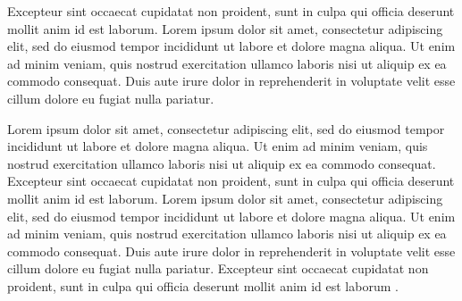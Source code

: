 \documentclass[english]{sbc2025}%
\begin{document}
Excepteur sint occaecat cupidatat non proident, sunt in culpa qui officia deserunt mollit anim id est laborum. Lorem ipsum dolor sit amet, consectetur adipiscing elit, sed do eiusmod tempor incididunt ut labore et dolore magna aliqua. Ut enim ad minim veniam, quis nostrud exercitation ullamco laboris nisi ut aliquip ex ea commodo consequat. Duis aute irure dolor in reprehenderit in voluptate velit esse cillum dolore eu fugiat nulla pariatur. 

Lorem ipsum dolor sit amet, consectetur adipiscing elit, sed do eiusmod tempor incididunt ut labore et dolore magna aliqua. Ut enim ad minim veniam, quis nostrud exercitation ullamco laboris nisi ut aliquip ex ea commodo consequat. Excepteur sint occaecat cupidatat non proident, sunt in culpa qui officia deserunt mollit anim id est laborum. Lorem ipsum dolor sit amet, consectetur adipiscing elit, sed do eiusmod tempor incididunt ut labore et dolore magna aliqua. Ut enim ad minim veniam, quis nostrud exercitation ullamco laboris nisi ut aliquip ex ea commodo consequat. Duis aute irure dolor in reprehenderit in voluptate velit esse cillum dolore eu fugiat nulla pariatur. Excepteur sint occaecat cupidatat non proident, sunt in culpa qui officia deserunt mollit anim id est laborum \citep{ref5}.
\end{document}
